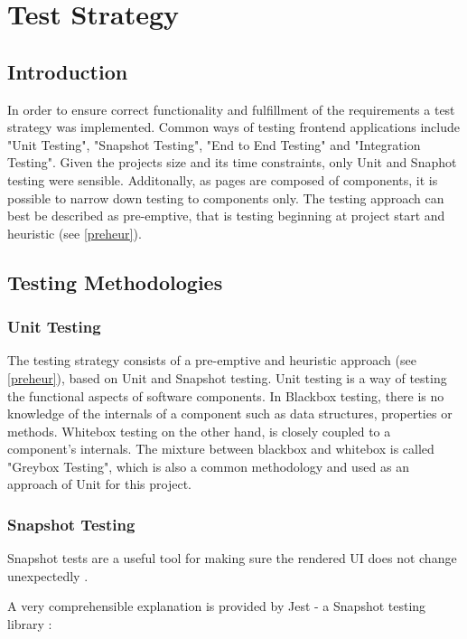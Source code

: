 \chapter[Test Strategy]{Test Strategy} \label{ch:testing}

\section{Introduction}
In order to ensure correct functionality and fulfillment of the requirements a test strategy was implemented. Common ways of testing frontend applications include "Unit Testing", "Snapshot Testing", "End to End Testing" and "Integration Testing". Given the projects size and its time constraints, only Unit and Snaphot testing were sensible. Additonally, as pages are composed of components, it is possible to narrow down testing to components only. The testing approach can best be described as pre-emptive, that is testing beginning at project start and heuristic (see \autoref{preheur}). 

\section{Testing Methodologies}

\subsection{Unit Testing}
The testing strategy consists of a pre-emptive and heuristic approach (see \autoref{preheur}), based on Unit and Snapshot testing.
Unit testing is a way of testing the functional aspects of software components. In Blackbox testing, there is no knowledge of the internals of a component such as data structures, properties or methods. Whitebox testing on the other hand, is closely coupled to a component's internals. The mixture between blackbox and whitebox is called "Greybox Testing", which is also a common methodology \cite{spillner2014software} and used as an approach of Unit for this project.

\subsection{Snapshot Testing}
Snapshot tests are a useful tool for making sure the rendered UI does not change unexpectedly \cite{SnapshotJest:online}.

A very comprehensible explanation is provided by Jest - a Snapshot testing library \cite{SnapshotJest:online}:

